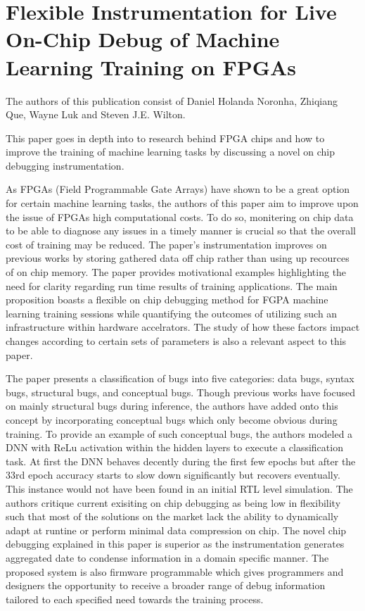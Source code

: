 \section{Flexible Instrumentation for Live On-Chip Debug of Machine Learning Training on FPGAs}\label{sec:paper4}

The authors of this publication consist of Daniel Holanda Noronha, Zhiqiang Que, Wayne Luk and Steven J.E. Wilton.

This paper goes in depth into to research behind FPGA chips and how to improve the training of machine learning tasks by discussing a novel on chip debugging instrumentation.

As FPGAs (Field Programmable Gate Arrays) have shown to be a great option for certain machine learning tasks, the authors of this paper aim to improve upon the issue of FPGAs high computational costs. 
To do so, monitering on chip data to be able to diagnose any issues in a timely manner is crucial so that the overall cost of training may be reduced. The paper's instrumentation improves on previous works by storing gathered data off chip rather than using up recources of on chip memory. The paper provides motivational examples highlighting the need for clarity regarding run time results of training applications. The main proposition boasts a flexible on chip debugging method for FGPA machine learning training sessions while quantifying the outcomes of utilizing such an infrastructure within hardware accelrators. The study of how these factors impact changes according to certain sets of parameters is also a relevant aspect to this paper.

The paper presents a classification of bugs into five categories: data bugs, syntax bugs, structural bugs, and conceptual bugs. Though previous works have focused on mainly structural bugs during inference, the authors have added onto this concept by incorporating conceptual bugs which only become obvious during training. To provide an example of such conceptual bugs, the authors modeled a DNN with ReLu activation within the hidden layers to execute a classification task. At first the DNN behaves decently during the first few epochs but after the 33rd epoch accuracy starts to slow down significantly but recovers eventually. This instance would not have been found in an initial RTL level simulation.
The authors critique current exisiting on chip debugging as being low in flexibility such that most of the solutions on the market lack the ability to dynamically adapt at runtine or perform minimal data compression on chip. The novel chip debugging explained in this paper is superior as the instrumentation generates aggregated date to condense information in a domain specific manner. The proposed system is also firmware programmable which gives programmers and designers the opportunity to receive a broader range of debug information tailored to each specified need towards the training process.